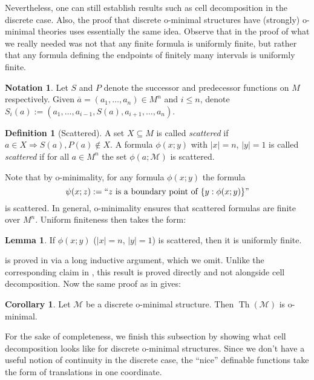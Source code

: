 \documentclass[a4paper]{report}
\newcommand{\ind}{\hspace{15pt}}
\newcommand{\M}{\mathcal{M}}
\renewcommand{\a}{\overline{a}}
\renewcommand{\implies}{\Rightarrow}
\DeclareMathOperator{\Th}{Th}
\theoremstyle{definition}
\newtheorem{lem}[thm]{Lemma}
\newtheorem{cor}[thm]{Corollary}
\newtheorem{defn}[thm]{Definition}
\theoremstyle{remstyle}
\newtheorem*{notation}{Notation}
\begin{document}
\ind Nevertheless, one can still establish results such as cell decomposition in the discrete case. Also, the proof that discrete o-minimal structures have (strongly) o-minimal theories uses essentially the same idea. Observe that in the proof of  what we really needed was not that any finite formula is uniformly finite, but rather that any formula defining the endpoints of finitely many intervals is uniformly finite.

\begin{notation}
	Let $S$ and $P$ denote the successor and predecessor functions on $M$ respectively. Given $\a=(a_1,\ldots,a_n)\in M^n$ and $i\leq n$, denote $S_i(a):=(a_1,\ldots,a_{i-1},S(a),a_{i+1},\ldots,a_n)$.
\end{notation}

\begin{defn}[Scattered]
	A set $X\subseteq M$ is called \emph{scattered} if $a\in X\implies S(a),P(a)\not\in X$. A formula $\phi(x;y)$ with $|x|=n$, $|y|=1$ is called \emph{scattered} if for all $a\in M^n$ the set $\phi(a;\M)$ is scattered.
\end{defn}

\ind Note that by o-minimality, for any formula $\phi(x;y)$ the formula
\begin{equation*}
	\psi(x;z):=``z\ \text{is a boundary point of}\ \{y:\phi(x;y)\}"
\end{equation*}
is scattered. In general, o-minimality ensures that scattered formulas are finite over $M^n$. Uniform finiteness then takes the form:

\begin{lem}\label{unifinitediscrete}
	If $\phi(x;y)$ ($|x|=n$, $|y|=1$) is scattered, then it is uniformly finite.
\end{lem}

\ind {} is proved in \cite{defIII} via a long inductive argument, which we omit. Unlike the corresponding claim in , this result is proved directly and not alongside cell decomposition. Now the same proof as in  gives:

\begin{cor}
	Let $\M$ be a discrete o-minimal structure. Then $\Th(\M)$ is o-minimal.
\end{cor}

\ind For the sake of completeness, we finish this subsection by showing what cell decomposition looks like for discrete o-minimal structures. Since we don't have a useful notion of continuity in the discrete case, the ``nice'' definable functions take the form of translations in one coordinate.
\end{document}
